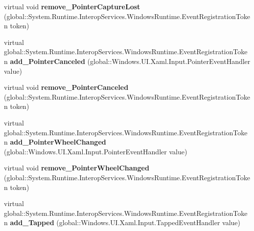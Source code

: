 \begin{DoxyCompactItemize}
\mbox{\label{class_windows_1_1_u_i_1_1_xaml_1_1_u_i_element_a4dc1dfa9d14ef2157a60a0da178c4784}} 
virtual void {\bfseries remove\+\_\+\+Pointer\+Capture\+Lost} (global\+::\+System.\+Runtime.\+Interop\+Services.\+Windows\+Runtime.\+Event\+Registration\+Token token)
\item 
\mbox{\label{class_windows_1_1_u_i_1_1_xaml_1_1_u_i_element_ae4cad3c4c84130d0d6362bc7aed7ba7d}} 
virtual global\+::\+System.\+Runtime.\+Interop\+Services.\+Windows\+Runtime.\+Event\+Registration\+Token {\bfseries add\+\_\+\+Pointer\+Canceled} (global\+::\+Windows.\+U\+I.\+Xaml.\+Input.\+Pointer\+Event\+Handler value)
\item 
\mbox{\label{class_windows_1_1_u_i_1_1_xaml_1_1_u_i_element_a2ce3ea526a5e9942687b9fe640cbdb26}} 
virtual void {\bfseries remove\+\_\+\+Pointer\+Canceled} (global\+::\+System.\+Runtime.\+Interop\+Services.\+Windows\+Runtime.\+Event\+Registration\+Token token)
\item 
\mbox{\label{class_windows_1_1_u_i_1_1_xaml_1_1_u_i_element_a789daf5519a2893ca5d46308010e2bae}} 
virtual global\+::\+System.\+Runtime.\+Interop\+Services.\+Windows\+Runtime.\+Event\+Registration\+Token {\bfseries add\+\_\+\+Pointer\+Wheel\+Changed} (global\+::\+Windows.\+U\+I.\+Xaml.\+Input.\+Pointer\+Event\+Handler value)
\item 
\mbox{\label{class_windows_1_1_u_i_1_1_xaml_1_1_u_i_element_ac3ff4695ca9eb06d618cbf67509cf594}} 
virtual void {\bfseries remove\+\_\+\+Pointer\+Wheel\+Changed} (global\+::\+System.\+Runtime.\+Interop\+Services.\+Windows\+Runtime.\+Event\+Registration\+Token token)
\item 
\mbox{\label{class_windows_1_1_u_i_1_1_xaml_1_1_u_i_element_a424707fb793f3cb0d3d9c1a1d642c7e1}} 
virtual global\+::\+System.\+Runtime.\+Interop\+Services.\+Windows\+Runtime.\+Event\+Registration\+Token {\bfseries add\+\_\+\+Tapped} (global\+::\+Windows.\+U\+I.\+Xaml.\+Input.\+Tapped\+Event\+Handler value)
\item 
\mbox{\label{class_windows_1_1_u_i_1_1_xaml_1_1_u_i_element_a2e2bb189943aceb74962211a295014c7}} 

\end{DoxyCompactItemize}
